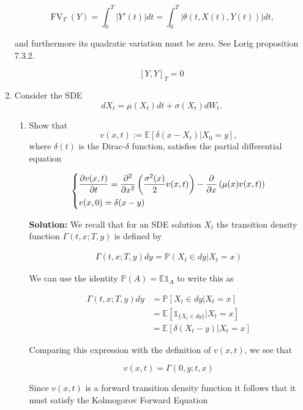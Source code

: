 \documentclass[12pt, a4paper]{article}
\begin{document}
\begin{enumerate}
    $$\operatorname{FV}_T(Y) = \int_0^T |Y'(t)|dt=\int_0^T |\theta(t, X(t), Y(t))|dt,$$

    and furthermore its quadratic variation must be zero. See Lorig proposition 7.3.2.

    $$[Y,Y]_T=0$$


    \item Consider the SDE $$dX_t = \mu(X_t)dt + \sigma(X_t)dW_t.$$
    
    \begin{enumerate}
        \item Show that $$v(x,t):= \mathbb E\left[ \delta(x-X_t)\Big| X_0=y \right],$$
        where $\delta(t)$ is the Dirac-$\delta$ function, satisfies the partial differential equation 

        \begin{align*}
            \begin{dcases}
                \frac{\partial v(x,t)}{\partial t} = \frac{\partial^2}{\partial x^2} \left( \frac{\sigma^2(x)}{2} v(x,t) \right) - \frac{\partial}{\partial x} \left( \mu(x) v(x,t) \right) \\
                v(x,0) = \delta(x-y)
            \end{dcases}
        \end{align*}

        \textbf{Solution:} We recall that for an SDE solution $X_t$ the transition density function $\Gamma(t,x;T,y)$ is defined by 

        \begin{align*}
            \Gamma(t,x;T,y)dy = \mathbb P(X_t \in dy|X_t = x)
        \end{align*}

        We can use the identity $\mathbb P(A) = \mathbb E \mathds 1_A$ to write this as

        \begin{align*}
            \Gamma(t,x;T,y)dy &= \mathbb P\left[X_t \in dy\big|X_t = x\right] \\
            &= \mathbb E \left[ \mathds 1_{\{X_t \in dy\}} \big| X_t=x \right] \\
            &= \mathbb E \left[ \delta(X_t-y) \big| X_t=x \right]
        \end{align*}

        Comparing this expression with the definition of $v(x,t)$, we see that 

        $$v(x,t) = \Gamma(0,y;t,x)$$

        Since $v(x,t)$ is a forward transition density function it follows that it must satisfy the Kolmogorov Forward Equation


\end{enumerate}
\end{enumerate}
\end{document}
